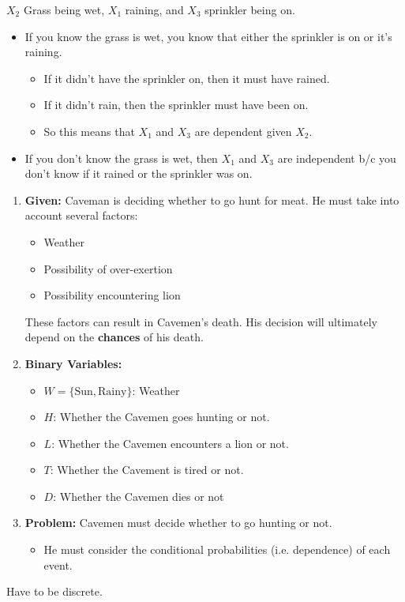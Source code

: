 \begin{example}
    $X_2$ Grass being wet, $X_1$ raining, and $X_3$ sprinkler being on.
    \begin{itemize}
        \item If you know the grass is wet, you know that either the sprinkler is on or it's raining.
        \begin{itemize}
            \item If it didn't have the sprinkler on, then it must have rained.
            \item If it didn't rain, then the sprinkler must have been on.
            \item So this means that $X_1$ and $X_3$ are dependent given $X_2$.
        \end{itemize}
        \item If you don't know the grass is wet, then $X_1$ and $X_3$ are independent b/c you don't know if it rained or the sprinkler was on.
    \end{itemize}
\end{example}

\begin{example}
    \begin{enumerate}
        \item \textbf{Given:} Caveman is deciding whether to go hunt for meat. He must take into account several factors:
        \begin{itemize}
            \item Weather
            \item Possibility of over-exertion
            \item Possibility encountering lion
        \end{itemize}

        These factors can result in Cavemen's death. His decision will ultimately depend on the \textbf{chances} of his death.
        \item \textbf{Binary Variables:}
        \begin{itemize}
            \item $W = \{\text{Sun}, \text{Rainy}\}$: Weather
            \item $H$: Whether the Cavemen goes hunting or not.
            \item $L$: Whether the Cavemen encounters a lion or not.
            \item $T$: Whether the Cavement is tired or not.
            \item $D$: Whether the Cavemen dies or not
        \end{itemize}
        \item \textbf{Problem:} Cavemen must decide whether to go hunting or not. 
        \begin{itemize}
            \item He must consider the conditional probabilities (i.e. dependence) of each event.
        \end{itemize}
    \end{enumerate}
\end{example}

\begin{warning}
    Have to be discrete. 
\end{warning}

